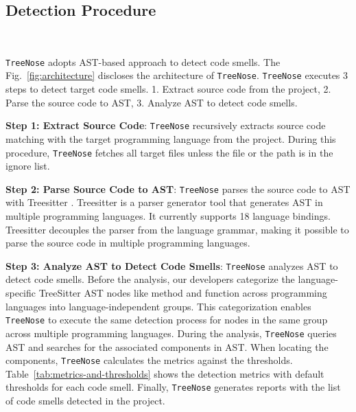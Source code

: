 

\subsection{Detection Procedure}~\label{sec:Detection Procedure}

\texttt{TreeNose} adopts AST-based approach to detect code smells. The
Fig.~\ref{fig:architecture} discloses the architecture of \texttt{TreeNose}.
\texttt{TreeNose} executes 3 steps to detect target code smells. 1. Extract
source code from the project, 2. Parse the source code to AST, 3. Analyze AST
to detect code smells.

\textbf{Step 1: Extract Source Code}: \texttt{TreeNose} recursively extracts
source code matching with the target programming language from the
project. During this procedure, \texttt{TreeNose} fetches all target files
unless the file or the path is in the ignore list.

\textbf{Step 2: Parse Source Code to AST}: \texttt{TreeNose} parses the source
code to AST with Treesitter \cite{treeSitter}. Treesitter is a parser generator
tool that generates AST in multiple programming languages. It currently
supports 18 language bindings. Treesitter decouples the parser from the
language grammar, making it possible to parse the source code in multiple
programming languages.

\textbf{Step 3: Analyze AST to Detect Code Smells}: \texttt{TreeNose} analyzes
AST to detect code smells. Before the analysis, our developers categorize the
language-specific TreeSitter AST nodes like method and function across
programming languages into language-independent groups. This categorization
enables \texttt{TreeNose} to execute the same detection process for nodes in
the same group across multiple programming languages. During the analysis,
\texttt{TreeNose} queries AST and searches for the associated components in
AST. When locating the components, \texttt{TreeNose} calculates the metrics
against the thresholds. Table~\ref{tab:metrics-and-thresholds} shows the
detection metrics with default thresholds for each code smell. Finally,
\texttt{TreeNose} generates reports with the list of code smells detected in
the project.


